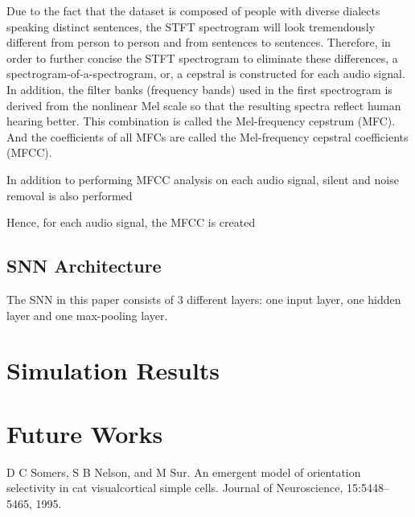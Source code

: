 \documentclass[11pt]{article}  %
\begin{document}
Due to the fact that the dataset is composed of people with diverse dialects speaking distinct sentences, the STFT spectrogram will look tremendously different from person to person and from sentences to sentences. Therefore, in order to further concise the STFT spectrogram to eliminate these differences, a spectrogram-of-a-spectrogram, or, a cepstral is constructed for each audio signal. In addition, the filter banks (frequency bands) used in the first spectrogram is derived from the nonlinear Mel scale \cite{b8} so that the resulting spectra reflect human hearing better. This combination is called the Mel-frequency cepstrum (MFC). And the coefficients of all MFCs are called the Mel-frequency cepstral coefficients (MFCC).

In addition to performing MFCC analysis on each audio signal, silent and noise removal is also performed 


Hence, for each audio signal, the MFCC is created

\subsection{SNN Architecture}
The SNN in this paper consists of 3 different layers: one input layer, one hidden layer and one max-pooling layer. 




\section{Simulation Results}
\label{sim_res}







\section{Future Works}
\label{future_works}


\begin{thebibliography}{00}
	 D C Somers, S B Nelson, and M Sur.  An emergent model of orientation selectivity in cat visualcortical simple cells. Journal of Neuroscience, 15:5448–5465, 1995.
\end{thebibliography}
\end{document}
